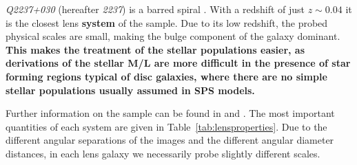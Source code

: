 \documentclass[useAMS,usenatbib]{mn2e}
\newcommand{\cb}[1]{{\color{red} \textbf{#1}}}
\begin{document}
\textit{Q2237+030} (hereafter \textit{2237}) is a barred spiral \citep{1988AJ.....95.1331Y}. With a redshift of just $z\sim0.04$ it is the closest lens \cb{system} of the sample. Due to its low redshift, the probed physical scales are small, making the bulge component of the galaxy dominant. \cb{This makes the treatment of the stellar populations easier, as derivations of the stellar M/L are more difficult in the presence of star forming regions typical of disc galaxies, where there are no simple stellar populations usually assumed in SPS models.}

Further information on the sample can be found in \citet{2011ApJ...740...97L} and \citet{2012A&A...538A..99S}. The most important quantities of each system are given in Table~\ref{tab:lensproperties}. Due to the different angular separations of the images and the different angular diameter distances, in each lens galaxy we necessarily probe slightly different scales.
\end{document}

